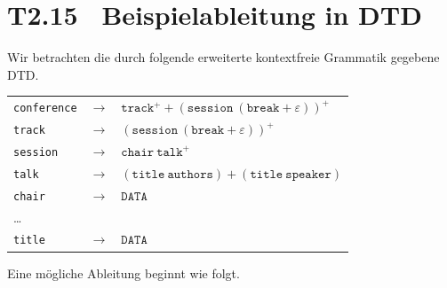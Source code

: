 \documentclass[fontsize=11pt, twoside=false, numbers=autoenddot]{scrbook}
\begin{document}
\pagebreak
\section*{T2.15~ Beispielableitung in DTD}

Wir betrachten die durch folgende erweiterte kontextfreie Grammatik
gegebene DTD.
%
\begin{center}
  \begin{tabular}{@{}lcl@{}}
    \texttt{conference} & $\to$ & $\texttt{track}^+ + (\texttt{session}~(\texttt{break} + \varepsilon))^+$ \\
    \texttt{track}      & $\to$ & $(\texttt{session}~(\texttt{break} + \varepsilon))^+$                    \\
    \texttt{session}    & $\to$ & $\texttt{chair}~ \texttt{talk}^+$                                        \\
    \texttt{talk}       & $\to$ & $(\texttt{title}~\texttt{authors}) + (\texttt{title}~\texttt{speaker})$  \\
    \texttt{chair}      & $\to$ & $\texttt{DATA}$                                                          \\
    \dots               &       &                                                                          \\
    \texttt{title}      & $\to$ & $\texttt{DATA}$
  \end{tabular}
\end{center}
%
Eine mögliche Ableitung beginnt wie folgt.
%
\end{document}
